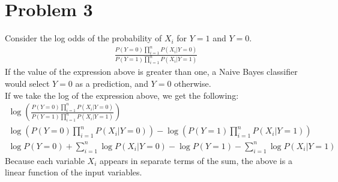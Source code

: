 \documentclass[12pt]{article}
\newcommand{\pd}{\\[2pt]}
\begin{document}
      \newpage
      \section*{Problem 3}
         Consider the log odds of the probability of $X_i$ for $Y = 1$ and $Y = 0$.
         \begin{align*}
            \frac{
               P(Y=0)\prod\limits_{i = 1}^{n}{P(X_i | Y = 0)}
            }{
               P(Y=1)\prod\limits_{i = 1}^{n}{P(X_i | Y = 1)}
            }
         \end{align*}
         If the value of the expression above is greater than one, a Naive Bayes
         classifier would select $Y = 0$ as a prediction, and $Y = 0$ otherwise.\pd
         If we take the log of the expression above, we get the following:
         \begin{gather*}
            \log\left(
               \frac{
                  P(Y=0)\prod\limits_{i = 1}^{n}{P(X_i | Y = 0)}
               }{
                  P(Y = 1)\prod\limits_{i = 1}^{n}{P(X_i | Y = 1)}
               }
            \right) \pd
            \log\left(P(Y=0)\prod\limits_{i = 1}^{n}{P(X_i | Y = 0)}\right) -
            \log\left(P(Y=1)\prod\limits_{i = 1}^{n}{P(X_i | Y = 1)}\right) \pd
            \log{P(Y = 0)} + \sum_{i=1}^{n}{\log P(X_i | Y=0)} -
            \log{P(Y = 1)} - \sum_{i=1}^{n}{\log P(X_i | Y = 1)}
         \end{gather*}
         Because each variable $X_i$ appears in separate terms of the sum, the above
         is a linear function of the input variables.

      \newpage
\end{document}
